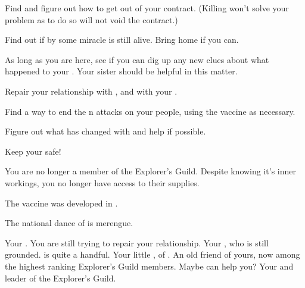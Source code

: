 \documentclass[char]{NeptuneBall}
\begin{document}
\begin{itemz}[Goals]
  \item Find \cWitch{} and figure out how to get out of your contract. (Killing \cWitch{} won't solve your problem as to do so will not void the contract.)
  \item Find out if by some miracle \cSlave{} is still alive. Bring \cSlave{\them} home if you can.
  \item As long as you are here, see if you can dig up any new  clues about what happened to your \cAthena{\parent}. Your sister should be helpful in this matter.
  \item Repair your relationship with \cKing{\King} \cKing{}, and with your \cPrincess{\sibling} \cPrincess{}.
	\item Find a way to end the \pPacifica{}n attacks on your people, using the \cPolio{} vaccine as necessary.
  \item Figure out what has changed with \cPriest{} and help \cPriest{\them} if possible.
  \item Keep your \cWillow{\offspring} safe!
\end{itemz}

\begin{itemz}[Notes]
  \item You are no longer a member of the Explorer's Guild. Despite knowing it's inner workings, you no longer have access to their supplies.
\end{itemz}

\begin{itemz}[Trivia]
  \item The \ppolio{} vaccine was developed in \pCity{}.
  \item The national dance of \pAtlantis{} is merengue.
\end{itemz}

\begin{contacts}
  \contact{\cKing{}} Your \cKing{\parent}. You are still trying to repair your relationship.
  \contact{\cWillow{}} Your \cWillow{\offspring}, who is still grounded. \cWillow{\They} is quite a handful.
  \contact{\cPrincess{}} Your little \cPrincess{\sibling}, \cPrincess{\prince} of \pAtlantis{}.
  \contact{\cPriest{}} An old friend of yours, now among the highest ranking Explorer's Guild members. Maybe \cPriest{\they} can help you?
  \contact{\cPlant{}} Your \cPlant{\uncle} and leader of the Explorer's Guild.
\end{contacts}
\end{document}
